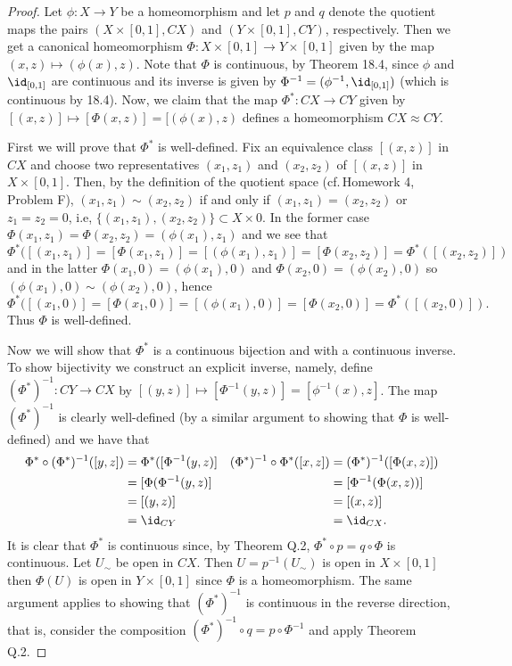 \begin{proof}
Let $\phi\colon X\to Y$ be a homeomorphism and let $p$ and $q$
denote the quotient maps the pairs $(X\times[0,1],CX)$ and
$(Y\times[0,1],CY)$, respectively. Then we get a canonical
homeomorphism $\Phi\colon X\times[0,1]\to Y\times[0,1]$ given by
the map $(x,z)\mapsto (\phi(x),z)$. Note that $\Phi$ is
continuous, by Theorem 18.4, since $\phi$ and $\id_{[0,1]}$ are
continuous and its inverse is given by
$\Phi^{-1}=(\phi^{-1},\id_{[0,1]})$ (which is continuous by
18.4). Now, we claim that the map $\Phi^*\colon CX\to CY$ given
by $[(x,z)]\mapsto[\Phi(x,z)]=[(\phi(x),z)$ defines a
homeomorphism $CX\approx CY$.

First we will prove that $\Phi^*$ is well-defined. Fix an
equivalence class $[(x,z)]$ in $CX$ and choose two
representatives $(x_1,z_1)$ and $(x_2,z_2)$ of $[(x,z)]$ in
$X\times[0,1]$. Then, by the definition of the quotient space
(cf.\,Homework 4, Problem F), $(x_1,z_1)\sim(x_2,z_2)$ if and
only if $(x_1,z_1)=(x_2,z_2)$ or $z_1=z_2=0$, i.e,
$\{(x_1,z_1),(x_2,z_2)\}\subset X\times 0$. In the former case
$\Phi(x_1,z_1)=\Phi(x_2,z_2)=(\phi(x_1),z_1)$ and we see that
\[
\Phi^*([(x_1,z_1)]=[\Phi(x_1,z_1)]=[(\phi(x_1),z_1)]=[\Phi(x_2,z_2)]=\Phi^*([(x_2,z_2)])
\]
and in the latter $\Phi(x_1,0)=(\phi(x_1),0)$ and
$\Phi(x_2,0)=(\phi(x_2),0)$ so $(\phi(x_1),0)\sim(\phi(x_2),0)$, hence
\[
\Phi^*([(x_1,0)]=[\Phi(x_1,0)]=[(\phi(x_1),0)]=[\Phi(x_2,0)]=\Phi^*([(x_2,0)]).
\]
Thus $\Phi$ is well-defined.

Now we will show that $\Phi^*$ is a continuous bijection and with
a continuous inverse. To show bijectivity we construct an
explicit inverse, namely, define $(\Phi^*)^{-1}\colon CY\to CX$
by $[(y,z)]\mapsto[\Phi^{-1}(y,z)]=[\phi^{-1}(x),z]$. The map
$(\Phi^*)^{-1}$ is clearly well-defined (by a similar argument to
showing that $\Phi$ is well-defined) and we have that
\begin{align*}
\Phi^*\circ(\Phi^*)^{-1}([y,z])
&=\Phi^*([\Phi^{-1}(y,z)]
&
(\Phi^*)^{-1}\circ\Phi^*([x,z])
&=(\Phi^*)^{-1}([\Phi(x,z)])
\\
&=[\Phi(\Phi^{-1}(y,z)]
&
&=[\Phi^{-1}(\Phi(x,z))]
\\
&=[(y,z)]
&
&=[(x,z)]\\
&=\id_{CY}
&&=\id_{CX}.
\end{align*}
It is clear that $\Phi^*$ is continuous since, by Theorem Q.2,
$\Phi^*\circ p=q\circ\Phi$ is continuous. Let $U_\sim$ be open in
$CX$. Then $U=p^{-1}(U_\sim)$ is open in $X\times[0,1]$ then
$\Phi(U)$ is open in $Y\times[0,1]$ since $\Phi$ is a
homeomorphism. The same argument applies to showing that
$(\Phi^*)^{-1}$ is continuous in the reverse direction, that is,
consider the composition $(\Phi^*)^{-1}\circ q=p\circ\Phi^{-1}$
and apply Theorem Q.2.
\end{proof}

